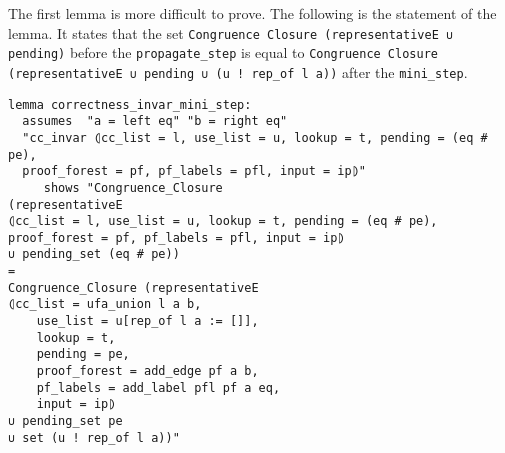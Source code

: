 The first lemma is more difficult to prove. The following is the statement of the lemma. It states that the set \lstinline{Congruence Closure (representativeE ∪ pending)} before the \lstinline{propagate_step} is equal to \lstinline{Congruence Closure (representativeE ∪ pending ∪ (u ! rep_of l a))} after the \lstinline{mini_step}.

\begin{lstlisting}[label=lst:correctness_invar_mini_step]
lemma correctness_invar_mini_step:
  assumes  "a = left eq" "b = right eq"
  "cc_invar ⦇cc_list = l, use_list = u, lookup = t, pending = (eq # pe),
  proof_forest = pf, pf_labels = pfl, input = ip⦈"
     shows "Congruence_Closure
(representativeE
⦇cc_list = l, use_list = u, lookup = t, pending = (eq # pe),
proof_forest = pf, pf_labels = pfl, input = ip⦈
∪ pending_set (eq # pe))
=
Congruence_Closure (representativeE
⦇cc_list = ufa_union l a b,
    use_list = u[rep_of l a := []],
    lookup = t,
    pending = pe,
    proof_forest = add_edge pf a b,
    pf_labels = add_label pfl pf a eq,
    input = ip⦈
∪ pending_set pe
∪ set (u ! rep_of l a))"
\end{lstlisting}

